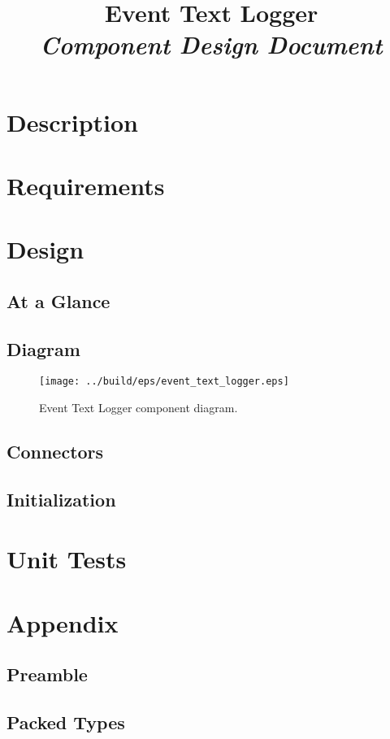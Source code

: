 



\title{\textbf{Event Text Logger} \\
\large\textit{Component Design Document}}
\date{}
\maketitle

\section{Description}


\section{Requirements}


\section{Design}

\subsection{At a Glance}


\subsection{Diagram}
\begin{figure}[H]
  \texttt{[image: ../build/eps/event\_text\_logger.eps]}
  \caption{Event Text Logger component diagram.}
\end{figure}

\subsection{Connectors}


\subsection{Initialization}


\section{Unit Tests}



\section{Appendix}
\subsection{Preamble}



\subsection{Packed Types}




